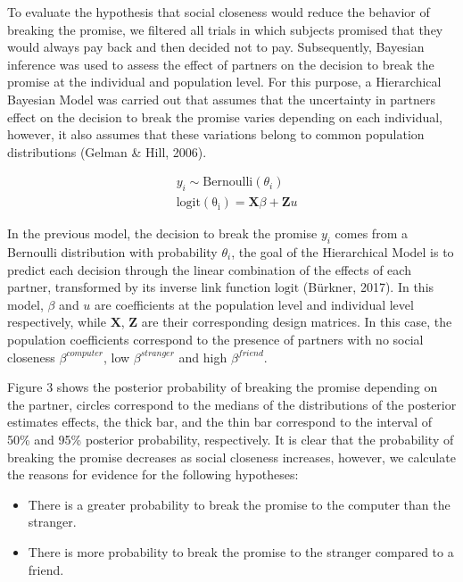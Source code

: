 \documentclass[12pt,]{article}
\begin{document}
To evaluate the hypothesis that social closeness would reduce the
behavior of breaking the promise, we filtered all trials in which
subjects promised that they would always pay back and then decided not
to pay. Subsequently, Bayesian inference was used to assess the effect
of partners on the decision to break the promise at the individual and
population level. For this purpose, a Hierarchical Bayesian Model was
carried out that assumes that the uncertainty in partners effect on the
decision to break the promise varies depending on each individual,
however, it also assumes that these variations belong to common
population distributions (Gelman \& Hill, 2006).

\[
\begin{aligned}
&y_i \sim \mathrm{Bernoulli}(\theta_i) \\
&\mathrm{logit(\theta_i)} = \mathbf{X}\beta  +  \mathbf{Z}u
\end{aligned}
\]

In the previous model, the decision to break the promise \(y_i\) comes
from a Bernoulli distribution with probability \(\theta_i\), the goal of
the Hierarchical Model is to predict each decision through the linear
combination of the effects of each partner, transformed by its inverse
link function \(\mathrm{logit}\) (Bürkner, 2017). In this model,
\(\beta\) and \(u\) are coefficients at the population level and
individual level respectively, while \(\mathbf{X}\), \(\mathbf{Z}\) are
their corresponding design matrices. In this case, the population
coefficients correspond to the presence of partners with no social
closeness \(\beta^{computer}\), low \(\beta^{stranger}\) and high
\(\beta^{friend}\).

Figure 3 shows the posterior probability of breaking the promise
depending on the partner, circles correspond to the medians of the
distributions of the posterior estimates effects, the thick bar, and the
thin bar correspond to the interval of 50\% and 95\% posterior
probability, respectively. It is clear that the probability of breaking
the promise decreases as social closeness increases, however, we
calculate the reasons for evidence for the following hypotheses:

\begin{itemize}
\item
  There is a greater probability to break the promise to the computer
  than the stranger.
\item
  There is more probability to break the promise to the stranger
  compared to a friend.
\end{itemize}
\end{document}
